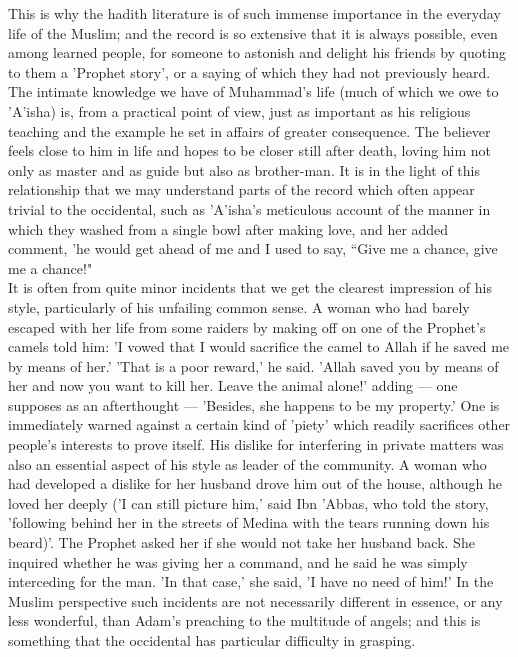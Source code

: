\documentclass[10pt, twoside,openright]{book}
\begin{document}
This is why the hadith literature is of such immense importance in the everyday life of the Muslim; 
and the record is so extensive that it is always possible, even among learned people, for someone to 
astonish and delight his friends by quoting to them a 'Prophet story', or a saying of which they had 
not previously heard. The intimate knowledge we have of Muhammad's life (much of which we owe to 
'A'isha) is, from a practical point of view, just as important as his religious teaching and the 
example he set in affairs of greater consequence. The believer feels close to him in life and hopes 
to be closer still after death, loving him not only as master and as guide but also as brother\hyp{}man. 
It is in the light of this relationship that we may understand parts of the record which often appear 
trivial to the occidental, such as 'A'isha's meticulous account of the manner in which they washed 
from a single bowl after making love, and her added comment, 'he would get ahead of me and I used to 
say, ``Give me a chance, give me a chance!" \\

It is often from quite minor incidents that we get the clearest impression of his style, particularly 
of his unfailing common sense. A woman who had barely escaped with her life from some raiders by 
making off on one of the Prophet's camels told him: 'I vowed that I would sacrifice the camel to 
Allah if he saved me by means of her.' 'That is a poor reward,' he said. 'Allah saved you by means of 
her and now you want to kill her. Leave the animal alone!' adding --- one supposes as an afterthought --- 
'Besides, she happens to be my property.' One is immediately warned against a certain kind of 'piety' 
which readily sacrifices other people's interests to prove itself. His dislike for interfering in 
private matters was also an essential aspect of his style as leader of the community. A woman who had 
developed a dislike for her husband drove him out of the house, although he loved her deeply ('I can 
still picture him,' said Ibn 'Abbas, who told the story, 'following behind her in the streets of 
Medina with the tears running down his beard)'. The Prophet asked her if she would not take her 
husband back. She inquired whether he was giving her a command, and he said he was simply interceding 
for the man. 'In that case,' she said, 'I have no need of him!' In the Muslim perspective such 
incidents are not necessarily different in essence, or any less wonderful, than Adam's preaching to 
the multitude of angels; and this is something that the occidental has particular difficulty in 
grasping. \\
\end{document}
